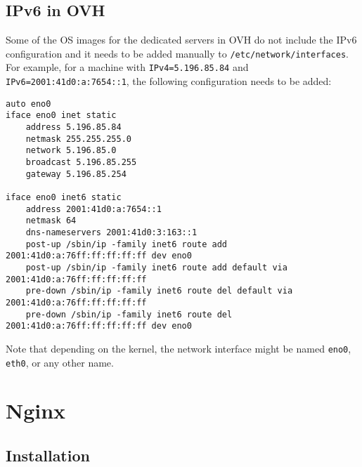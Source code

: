 \documentclass[a4paper,12pt]{article}
\begin{document}
\subsection{IPv6 in OVH}
Some of the OS images for the dedicated servers in OVH do not include the IPv6 configuration and it needs to be added manually to {\tt /etc/network/interfaces}.
For example, for a machine with {\tt IPv4=5.196.85.84} and {\tt IPv6=2001:41d0:a:7654::1}, the following configuration needs to be added:

\begin{verbatim}
auto eno0
iface eno0 inet static
    address 5.196.85.84
    netmask 255.255.255.0
    network 5.196.85.0
    broadcast 5.196.85.255
    gateway 5.196.85.254

iface eno0 inet6 static
    address 2001:41d0:a:7654::1
    netmask 64
    dns-nameservers 2001:41d0:3:163::1
    post-up /sbin/ip -family inet6 route add 2001:41d0:a:76ff:ff:ff:ff:ff dev eno0
    post-up /sbin/ip -family inet6 route add default via 2001:41d0:a:76ff:ff:ff:ff:ff
    pre-down /sbin/ip -family inet6 route del default via 2001:41d0:a:76ff:ff:ff:ff:ff
    pre-down /sbin/ip -family inet6 route del 2001:41d0:a:76ff:ff:ff:ff:ff dev eno0
\end{verbatim}

Note that depending on the kernel, the network interface might be named {\tt eno0}, {\tt eth0}, or any other name.


\begin{comment}
\subsection{Manual configurations}
Some of the installed packages need manual changes in their configuration.

- Octave: edit the file {\tt /usr/share/octave/site/m/startup/octaverc} and {\tt add pkg load image}.
\end{comment}


\section{Nginx}

\subsection{Installation}
\end{document}
